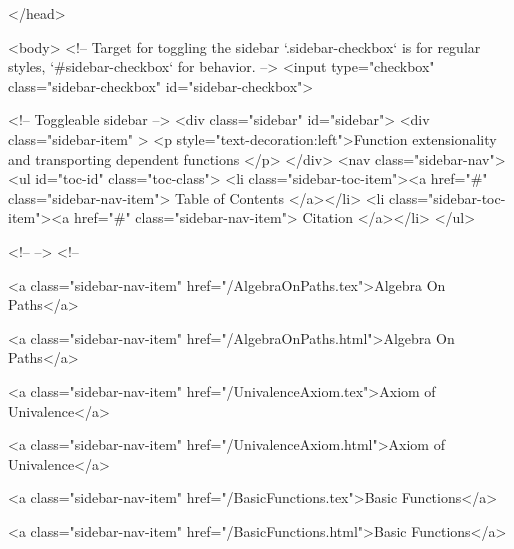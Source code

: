   
</head>




  <body>
    <!-- Target for toggling the sidebar `.sidebar-checkbox` is for regular
     styles, `#sidebar-checkbox` for behavior. -->
<input type="checkbox" class="sidebar-checkbox" id="sidebar-checkbox">

<!-- Toggleable sidebar -->
<div class="sidebar" id="sidebar">
  <div class="sidebar-item" >
    <p style="text-decoration:left">Function extensionality and transporting dependent functions </p>
  </div>
  <nav class="sidebar-nav">
    <ul id="toc-id" class="toc-class">
  <li class="sidebar-toc-item"><a href="#" class="sidebar-nav-item"> Table of Contents </a></li>
  <li class="sidebar-toc-item"><a href="#" class="sidebar-nav-item"> Citation </a></li>
</ul>


    <!--  -->
    <!-- 
      
    
      
    
      
    
      
        
      
    
      
        
          <a class="sidebar-nav-item" href="/AlgebraOnPaths.tex">Algebra On Paths</a>
        
      
    
      
        
          <a class="sidebar-nav-item" href="/AlgebraOnPaths.html">Algebra On Paths</a>
        
      
    
      
        
          <a class="sidebar-nav-item" href="/UnivalenceAxiom.tex">Axiom of Univalence</a>
        
      
    
      
        
          <a class="sidebar-nav-item" href="/UnivalenceAxiom.html">Axiom of Univalence</a>
        
      
    
      
        
          <a class="sidebar-nav-item" href="/BasicFunctions.tex">Basic Functions</a>
        
      
    
      
        
          <a class="sidebar-nav-item" href="/BasicFunctions.html">Basic Functions</a>
        
      
    
